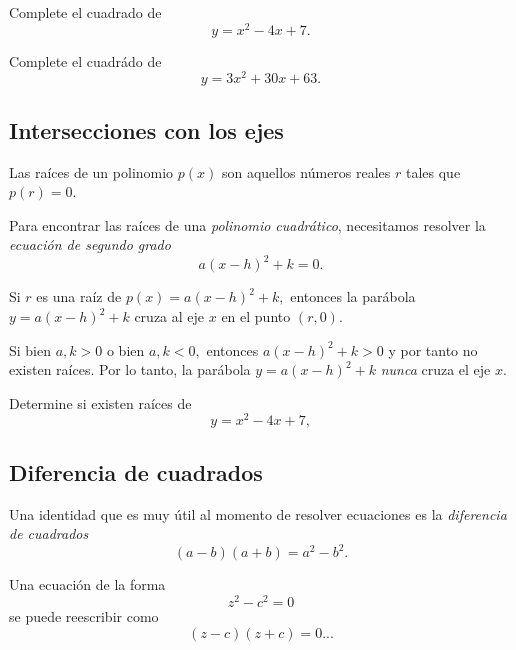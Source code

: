 	\begin{problema}
		Complete el cuadrado de
		$$y=x^2-4x+7.$$
	\end{problema}
	



	\begin{problema}
		Complete el cuadrádo de
		$$
		y=3x^2+30x+63.
		$$
	\end{problema}
	


\subsection{Intersecciones con los ejes}


	Las ra\'ices de un polinomio $p(x)$ son aquellos números reales $r$ tales que $p(r)=0.$



	Para encontrar las ra\'ices de una \emph{polinomio cuadrático}, necesitamos resolver la \emph{ecuaci\'on de segundo grado}
	$$
	a(x-h)^{2}+k=0.
	$$



	Si $r$ es una ra\'iz de $p(x)=a(x-h)^{2}+k,$ entonces la parábola $y=a(x-h)^{2}+k$ cruza al eje $x$ en el punto $(r,0).$




	\begin{rem}
		Si bien $a,k>0$ o bien $a,k<0,$ entonces $a(x-h)^{2}+k>0$ y por tanto no existen ra\'ices. Por lo tanto, la parábola $y=a(x-h)^{2}+k$ \emph{nunca} cruza el eje $x.$ 
	\end{rem}
	



	\begin{problema}
		Determine si existen ra\'ices de
		$$
		y=x^2-4x+7,
		$$ 
	\end{problema}
	



\subsection{Diferencia de cuadrados}


	Una identidad que es muy útil al momento de resolver ecuaciones es la \emph{diferencia de cuadrados}
	$$
	\left( a-b \right)\left( a+b \right)=a^{2}-b^{2}.
	$$



	Una ecuaci\'on de la forma 
	$$
	z^{2}-c^{2}=0
	$$
	se puede reescribir como
	$$
	\left( z-c \right)\left( z+c \right)=0...
	$$
	
